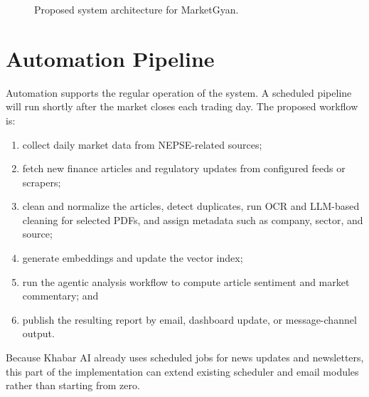 \documentclass[12pt,a4paper]{report}
\begin{document}
\begin{figure}[htbp]
{%
}
\caption{Proposed system architecture for MarketGyan.}
\label{fig:architecture}
\end{figure}

\section{Automation Pipeline}
Automation supports the regular operation of the system. A scheduled pipeline will run shortly after the market closes each trading day. The proposed workflow is:
\begin{enumerate}[leftmargin=1.6em]
    \item collect daily market data from \ac{NEPSE}-related sources;
    \item fetch new finance articles and regulatory updates from configured feeds or scrapers;
    \item clean and normalize the articles, detect duplicates, run OCR and \ac{LLM}-based cleaning for selected PDFs, and assign metadata such as company, sector, and source;
    \item generate embeddings and update the vector index;
    \item run the agentic analysis workflow to compute article sentiment and market commentary; and
    \item publish the resulting report by email, dashboard update, or message-channel output.
\end{enumerate}

Because Khabar AI already uses scheduled jobs for news updates and newsletters, this part of the implementation can extend existing scheduler and email modules rather than starting from zero.
\end{document}
